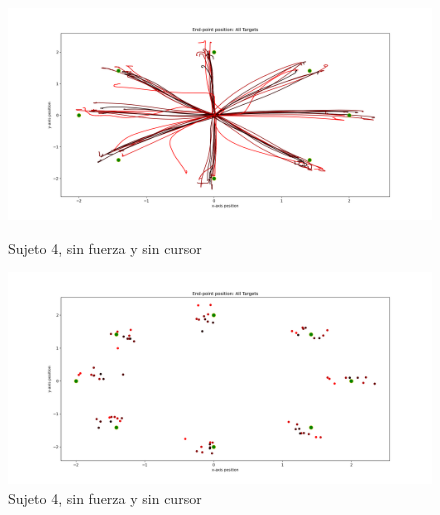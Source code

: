 \documentclass[a4paper,11pt, oneside]{book}
\begin{document}
\begin{figure}[H]
	\begin{minipage}[b]{0.5\linewidth}
		\centering
		\includegraphics[width=\linewidth]{sujeto4/no_force_no_cursor/trayectorias}
		\caption{Sujeto 4, sin fuerza y sin cursor}
		\label{4-fase3-1}
	\end{minipage}
	\hspace{0.5cm}
	\begin{minipage}[b]{0.5\linewidth}
		\centering
		\includegraphics[width=\linewidth]{sujeto4/no_force_no_cursor/trayectorias_puntos}
		\caption{Sujeto 4, sin fuerza y sin cursor}
		\label{4-fase3-2}
	\end{minipage}
\end{figure}
\end{document}
